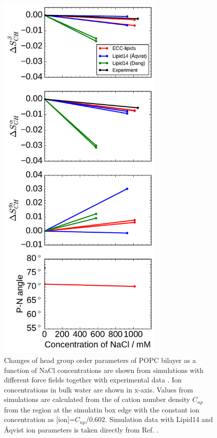 \documentclass[aip,jcp,twocolumn]{revtex4}
\begin{document}
\begin{figure}[tbp]
  \centering
  \includegraphics[width=8.0cm]{../Fig/ipython_nb/PN_angle_OrdPars-A-B-g3_L14-ECCL17_q80_sig89_NaCl.pdf}
  \caption{\label{fig:delta_ordPar_NaCl}
    Changes of head group order parameters of POPC bilayer as a function of NaCl concentrations
    are shown from simulations with different force fields together with experimental data \cite{akutsu81}. 
    Ion concentrations in bulk water are shown in x-axis. 
    Values from simulations are calculated from the of cation number density $C_{np}$
    from the region at the simulatin box edge with the constant ion concentration as [ion]=$C_{np}/0.602$.
    Simulation data with Lipid14 and \AA{}qvist ion parameters is taken directly from Ref. \cite{catte16}.
  }
\end{figure}
\end{document}
